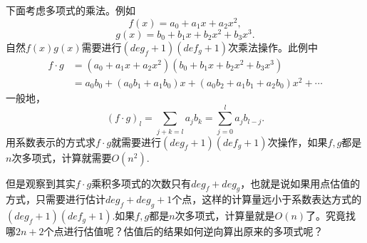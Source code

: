 \documentclass[10pt]{ctexart}
\begin{document}
下面考虑多项式的乘法。例如
$$
f(x) = a_0 + a_1 x + a_2 x^2,
$$
$$
g(x) = b_0 + b_1 x + b_2 x^2 + b_3 x^3.
$$
自然$f(x)g(x)$需要进行$(deg_f + 1)(def_g + 1)$次乘法操作。此例中
\begin{displaymath}
    \begin{aligned}
        f \cdot g & = (a_0 + a_1 x + a_2 x^2)(b_0 + b_1 x + b_2 x^2 + b_3 x^3) \\
        & = a_0b_0 + (a_0b_1 + a_1 b_0)x + (a_0b_2 + a_1 b_1 + a_2 b_0)x^2 + \cdots
    \end{aligned}
\end{displaymath}
一般地，
$$
(f \cdot g)_l = \sum_{j + k = l} a_j b_k =  \sum_{j=0}^l a_j b_{l-j}.
$$
用系数表示的方式求$f \cdot g$就需要进行$(deg_f + 1)(def_g + 1)$次操作，如果$f,g$都是$n$次多项式，计算就需要$O(n^2)$.

但是观察到其实$f \cdot g$乘积多项式的次数只有$deg_f + deg_g$，也就是说如果用点估值的方式，只需要进行估计$deg_f + deg_g + 1$个点，这样的计算量远小于系数表达方式的$(deg_f + 1)(def_g + 1)$.如果$f,g$都是$n$次多项式，计算量就是$O(n)$了。究竟找哪$2n + 2$个点进行估值呢？估值后的结果如何逆向算出原来的多项式呢？
\end{document}

